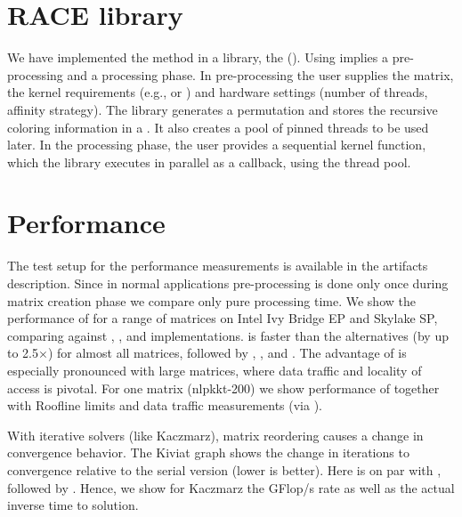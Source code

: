 \section{RACE library}

We have implemented the \RAC method in a library, the \RACEfull (\RACE).
Using \RACE implies a pre-processing and a processing phase.
In pre-processing the user supplies the matrix, the kernel requirements
(e.g., \DONE or \DTWO) and hardware settings (number of threads,
affinity strategy). The library generates a permutation and stores the
recursive coloring information in a \levelTree. It also creates
a pool of pinned threads to be used later. In the processing phase,
the user provides a sequential kernel function, which the library
executes in parallel as a callback, using the thread pool. 

\section{Performance}

The test setup for the performance measurements is available in the
artifacts description. Since in normal applications pre-processing is done
only once during matrix creation phase we compare only pure processing time.
We show the performance of \SymmSpmv %
for a range of matrices on Intel Ivy Bridge EP and Skylake SP,
comparing \RACE against \ABMC, \MC, and \MKL implementations. \RACE is
faster than the alternatives (by up to 2.5$\times$) for almost all
matrices, followed by \ABMC, \MKL, and \MC. The advantage of \RACE is
especially pronounced with large matrices, where data traffic and
locality of access is pivotal. For one matrix (nlpkkt-200) we show
performance of \SymmSpmv together with Roof\/line limits and data
traffic measurements (via \LIKWID \cite{LIKWID}).


With iterative solvers (like Kaczmarz), matrix reordering causes a change
in convergence behavior. The Kiviat graph shows the change in
iterations to convergence relative to the serial version (lower is
better). Here \RACE is on par with
\ABMC, followed by \MC. Hence, we show for Kaczmarz the GFlop/s rate as
well as the actual inverse time to solution.
